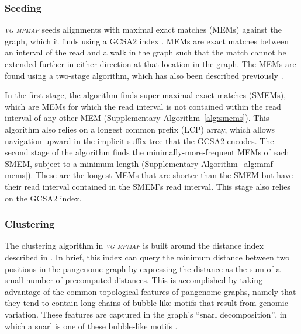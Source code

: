 \documentclass[11pt]{ucthesis}
\newcommand{\tool}[1]{\emph{\textsc{#1}}}
\begin{document}
\subsubsection{Seeding}

\tool{vg mpmap} seeds alignments with maximal exact matches (MEMs) against the graph, which it finds using a GCSA2 index \cite{siren2017indexing}. MEMs are exact matches between an interval of the read and a walk in the graph such that the match cannot be extended further in either direction at that location in the graph. The MEMs are found using a two-stage algorithm, which has also been described previously \cite{garrison2018variation}. 

In the first stage, the algorithm finds super-maximal exact matches (SMEMs), which are MEMs for which the read interval is not contained within the read interval of any other MEM (Supplementary Algorithm~\ref{alg:smems}). This algorithm also relies on a longest common prefix (LCP) array, which allows navigation upward in the implicit suffix tree that the GCSA2 encodes. The second stage of the algorithm finds the minimally-more-frequent MEMs of each SMEM, subject to a minimum length (Supplementary Algorithm~\ref{alg:mmf-mems}). These are the longest MEMs that are shorter than the SMEM but have their read interval contained in the SMEM's read interval. This stage also relies on the GCSA2 index.

\subsubsection{Clustering}

The clustering algorithm in \tool{vg mpmap} is built around the distance index described in \cite{chang2020distance}. In brief, this index can query the minimum distance between two positions in the pangenome graph by expressing the distance as the sum of a small number of precomputed distances. This is accomplished by taking advantage of the common topological features of pangenome graphs, namely that they tend to contain long chains of bubble-like motifs that result from genomic variation. These features are captured in the graph's ``snarl decomposition'', in which a snarl is one of these bubble-like motifs \cite{paten2018superbubbles}.
\end{document}
